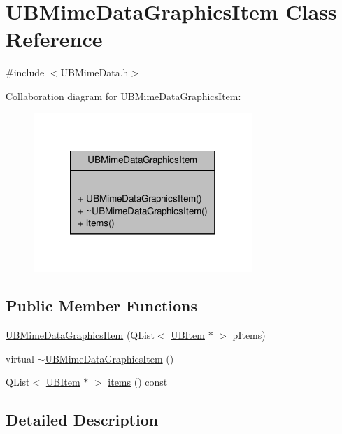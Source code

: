 \hypertarget{class_u_b_mime_data_graphics_item}{\section{U\-B\-Mime\-Data\-Graphics\-Item Class Reference}
\label{da/de4/class_u_b_mime_data_graphics_item}
}


{\ttfamily \#include $<$U\-B\-Mime\-Data.\-h$>$}



Collaboration diagram for U\-B\-Mime\-Data\-Graphics\-Item\-:
\nopagebreak
\begin{figure}[H]
\begin{center}
\leavevmode
\includegraphics[width=234pt]{d9/d4f/class_u_b_mime_data_graphics_item__coll__graph}
\end{center}
\end{figure}
\subsection*{Public Member Functions}
\begin{DoxyCompactItemize}
\item 
\hyperlink{class_u_b_mime_data_graphics_item_aeefca155fbed6515b96b9d9a437b4e7f}{U\-B\-Mime\-Data\-Graphics\-Item} (Q\-List$<$ \hyperlink{class_u_b_item}{U\-B\-Item} $\ast$ $>$ p\-Items)
\item 
virtual \hyperlink{class_u_b_mime_data_graphics_item_abbff540d0dfb2ad1d67e4bd957698501}{$\sim$\-U\-B\-Mime\-Data\-Graphics\-Item} ()
\item 
Q\-List$<$ \hyperlink{class_u_b_item}{U\-B\-Item} $\ast$ $>$ \hyperlink{class_u_b_mime_data_graphics_item_a62b20e5cb419dd694373549eae4912f6}{items} () const 
\end{DoxyCompactItemize}


\subsection{Detailed Description}



